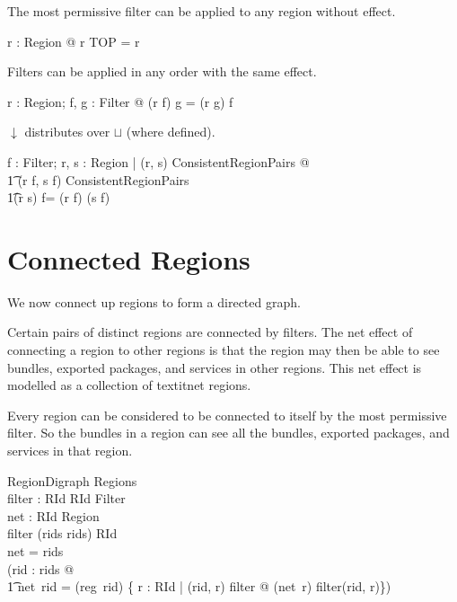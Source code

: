 \documentclass[a4paper,9pt]{article}
\begin{document}
The most permissive filter can be applied to any region without effect.
\begin{argue}
  \shows \forall r : Region @ r \downarrow TOP = r \\
\end{argue}

Filters can be applied in any order with the same effect.
\begin{argue}
  \shows \forall r : Region; f, g : Filter @ (r \downarrow f) \downarrow g = (r \downarrow g) \downarrow f \\
\end{argue}

$\downarrow$ distributes over $\sqcup$ (where defined).
\begin{argue}
  \shows \forall f : Filter; r, s : Region | (r, s) \in ConsistentRegionPairs @ \\
\t1 (r \downarrow f, s \downarrow f) \in ConsistentRegionPairs \land \\
\t1(r \sqcup s) \downarrow f= (r \downarrow f) \sqcup (s \downarrow f) \\
\end{argue}

\clearpage
\section{Connected Regions}
\label{cha:connregions}

We now connect up regions to form a directed graph.

Certain pairs of distinct regions are connected by filters. The net effect of connecting a region to other
regions is that the region may then be able to see bundles, exported packages, and services in other regions.
This net effect is modelled as a collection of textit{net} regions.

Every region can be considered to be connected to itself by the most permissive filter.
So the bundles in a region can see all the bundles, exported packages, and services in that region.
\begin{schema}{RegionDigraph}
  Regions \\
  filter : RId \cross RId \pfun Filter \\
  net : RId \pfun Region \\
\where
  \dom filter \subseteq (rids \cross rids) \setminus \id RId \\
  \dom net = rids \\
  (\forall rid : rids @ \\
\t1 net~rid = (reg~rid) \sqcup \bigsqcup \{ r : RId | (rid, r) \in \dom filter @ (net~r) \downarrow filter(rid, r)\})\\
\end{schema}
\end{document}
